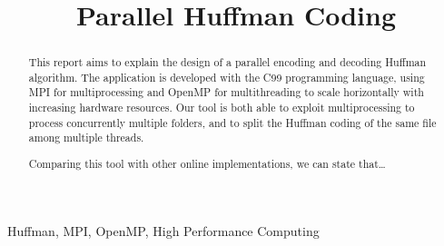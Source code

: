 \documentclass[conference]{IEEEtran}
\begin{document}
\title{Parallel Huffman Coding}

\author{
    \and
}

\maketitle

\thispagestyle{plain}
\pagestyle{plain}

\begin{abstract}
    This report aims to explain the design of a parallel encoding and decoding Huffman algorithm. The application is developed with the C99 programming language, using MPI for multiprocessing and OpenMP for multithreading to scale horizontally with increasing hardware resources. Our tool is both able to exploit multiprocessing to process concurrently multiple folders, and to split the Huffman coding of the same file among multiple threads.

    Comparing this tool with other online implementations, we can state that\dots
\end{abstract}

\begin{IEEEkeywords}
    Huffman, MPI, OpenMP, High Performance Computing
\end{IEEEkeywords}






{}

\end{document}
